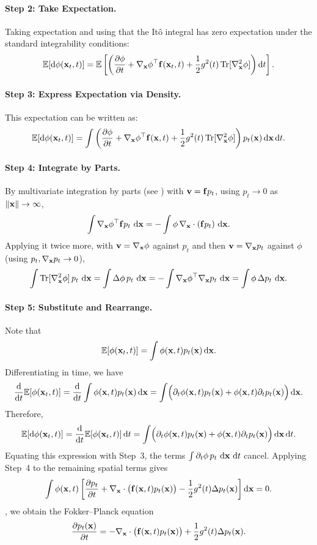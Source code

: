 \paragraph{Step 2: Take Expectation.}
Taking expectation and using that the It\^o integral has zero expectation
under the standard integrability conditions:
\[
\mathbb{E}[\mathop{}\!\mathrm{d} \phi({\mathbf{x}}_t, t)] = \mathbb{E} \left[ \left( \frac{\partial \phi}{\partial t} + \nabla_{{\mathbf{x}}} \phi^\top {\mathbf{f}}({\mathbf{x}}_t, t) + \frac{1}{2} g^2(t) \operatorname{Tr}[\nabla_{{\mathbf{x}}}^2 \phi] \right) \mathop{}\!\mathrm{d} t \right].
\]
\paragraph{Step 3: Express Expectation via Density.}
This expectation can be written as:
\[
\mathbb{E}[\mathop{}\!\mathrm{d} \phi({\mathbf{x}}_t, t)] = \int \left( \frac{\partial \phi}{\partial t} + \nabla_{{\mathbf{x}}} \phi^\top {\mathbf{f}}({\mathbf{x}}, t) + \frac{1}{2} g^2(t) \operatorname{Tr}[\nabla_{{\mathbf{x}}}^2 \phi] \right) p_t({\mathbf{x}}) \mathop{}\!\mathrm{d} {\mathbf{x}} \mathop{}\!\mathrm{d} t.
\]
\paragraph{Step 4: Integrate by Parts.}
\begingroup\color{notesblue}%
By multivariate integration by parts (see ) with ${\mathbf{v}} = {\mathbf{f}} p_t$, using $p_t \to 0$ as $\|{\mathbf{x}}\|\to\infty$,
\[
\int \nabla_{{\mathbf{x}}} \phi^\top {\mathbf{f}} p_t \,\mathop{}\!\mathrm{d} {\mathbf{x}} = -\int \phi\, \nabla_{{\mathbf{x}}} \cdot ({\mathbf{f}} p_t) \,\mathop{}\!\mathrm{d} {\mathbf{x}} .
\]
Applying it twice more, with ${\mathbf{v}} = \nabla_{{\mathbf{x}}}\phi$ against $p_t$ and then ${\mathbf{v}} = \nabla_{{\mathbf{x}}}p_t$ against $\phi$ (using $p_t, \nabla_{{\mathbf{x}}}p_t \to 0$),
\[
\int \operatorname{Tr}[\nabla_{{\mathbf{x}}}^2 \phi]\, p_t \,\mathop{}\!\mathrm{d} {\mathbf{x}}
= \int \Delta\phi\, p_t \,\mathop{}\!\mathrm{d} {\mathbf{x}}
= -\int \nabla_{{\mathbf{x}}}\phi^\top \nabla_{{\mathbf{x}}} p_t \,\mathop{}\!\mathrm{d} {\mathbf{x}}
= \int \phi\, \Delta p_t \,\mathop{}\!\mathrm{d} {\mathbf{x}} .
\]
\endgroup
\paragraph{Step 5: Substitute and Rearrange.}
Note that
\[
\mathbb{E}[\phi({\mathbf{x}}_t,t)] = \int \phi({\mathbf{x}},t) p_t({\mathbf{x}}) \mathop{}\!\mathrm{d}{\mathbf{x}}.
\]
Differentiating in time, we have
\[
\frac{\mathop{}\!\mathrm{d}}{\mathop{}\!\mathrm{d} t}\mathbb{E}[\phi({\mathbf{x}}_t,t)]
= \frac{\mathop{}\!\mathrm{d}}{\mathop{}\!\mathrm{d} t}\int \phi({\mathbf{x}},t) p_t({\mathbf{x}}) \mathop{}\!\mathrm{d}{\mathbf{x}}
= \int\Bigl(\partial_t\phi({\mathbf{x}},t) p_t({\mathbf{x}}) + \phi({\mathbf{x}},t) \partial_t p_t({\mathbf{x}})\Bigr)\mathop{}\!\mathrm{d}{\mathbf{x}}.
\]
Therefore,
\[
\mathbb{E}[\mathop{}\!\mathrm{d} \phi({\mathbf{x}}_t,t)]
= \frac{\mathop{}\!\mathrm{d}}{\mathop{}\!\mathrm{d} t}\mathbb{E}[\phi({\mathbf{x}}_t,t)] \mathop{}\!\mathrm{d} t
= \int\Bigl(\partial_t\phi({\mathbf{x}},t) p_t({\mathbf{x}}) + \phi({\mathbf{x}},t) \partial_t p_t({\mathbf{x}})\Bigr)\mathop{}\!\mathrm{d}{\mathbf{x}} \mathop{}\!\mathrm{d} t.
\]
Equating this expression with Step~3, the terms
$\int \partial_t\phi\,p_t\,\mathop{}\!\mathrm{d}{\mathbf{x}}\,\mathop{}\!\mathrm{d} t$ cancel. Applying Step~4 to
the remaining spatial terms gives
\[
\int
\phi({\mathbf{x}},t)
\left[
\frac{\partial p_t}{\partial t}
+
\nabla_{{\mathbf{x}}}\cdot\bigl({\mathbf{f}}({\mathbf{x}},t)p_t({\mathbf{x}})\bigr)
-
\frac{1}{2}g^2(t)\Delta p_t({\mathbf{x}})
\right]
\mathop{}\!\mathrm{d}{\mathbf{x}}
=
0.
\]
, we obtain the
Fokker--Planck equation
\[
\frac{\partial p_t({\mathbf{x}})}{\partial t}
=
-\nabla_{{\mathbf{x}}}\cdot\bigl({\mathbf{f}}({\mathbf{x}},t)p_t({\mathbf{x}})\bigr)
+
\frac{1}{2}g^2(t)\Delta p_t({\mathbf{x}}).
\]


